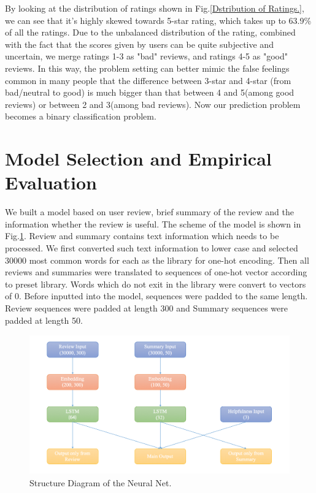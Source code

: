 \documentclass[letterpaper]{article} %
\begin{document}
By looking at the distribution of ratings shown in Fig.\ref{Dstribution of Ratings.}, we can see that it's highly skewed towards 5-star rating, which takes up to 63.9\% of all the ratings. Due to the unbalanced distribution of the rating, combined with the fact that the scores given by users can be quite subjective and uncertain, we merge ratings 1-3 as "bad" reviews, and ratings 4-5 as "good" reviews. In this way, the problem setting can better mimic the false feelings common in many people that the difference between 3-star and 4-star (from bad/neutral to good) is much bigger than that between 4 and 5(among good reviews) or between 2 and 3(among bad reviews). Now our prediction problem becomes a binary classification problem.

\section{Model Selection and Empirical Evaluation}
We built a model based on user review, brief summary of the review and the information whether the review is useful. The scheme of the model is shown in Fig.\ref{model}. Review and summary contains text information which needs to be processed. We first converted such text information to lower case and selected 30000 most common words for each as the library for one-hot encoding. Then all reviews and summaries were translated to sequences of one-hot vector according to preset library. Words which do not exit in the library were convert to vectors of 0. Before inputted into the model, sequences were padded to the same length. Review sequences were padded at length 300 and Summary sequences were padded at length 50. 

\begin{figure}[!h]
\centering
\includegraphics[height=6cm,width=1.0\columnwidth]{report/pics/structure_plot_2.png}
\caption{Structure Diagram of the Neural Net.}
\label{model}
\end{figure}
\end{document}
